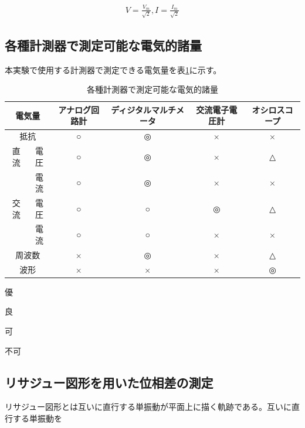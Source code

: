 \documentclass[dvipdfmx]{jsarticle}
\begin{document}
\begin{eqnarray}
V = \frac{V_m}{\sqrt{2}}, I = \frac{I_m}{\sqrt2}
\end{eqnarray}

\subsection{各種計測器で測定可能な電気的諸量}

本実験で使用する計測器で測定できる電気量を表\ref{tb:table_dennki}に示す。

\begin{table}[h]
  \caption{各種計測器で測定可能な電気的諸量}
  \label{tb:table_dennki}
  \begin{threeparttable}
    \begin{tabular}{|c|c|c|c|c|c|}\hline 
      \multicolumn{2}{|c|}{電気量} & アナログ回路計 & ディジタルマルチメータ & 交流電子電圧計 & オシロスコープ \\ \hline
      \multicolumn{2}{|c|}{抵抗} & ○\footnotemark[2] & ◎\footnotemark[1] & ×\footnotemark[4] & × \\ \cline{1-6}
      直流 & 電圧 & ○ & ◎ & × & △\footnotemark[3]\\ \cline{2-6}
       & 電流 & ○ & ◎ & × & ×\\ \hline
      交流 & 電圧 & ○ & ○ & ◎ & △\\ \cline{2-6}
       & 電流 & ○ & ○ & × & ×\\ \hline
      \multicolumn{2}{|c|}{周波数} & × & ◎ & × & △\\ \hline
      \multicolumn{2}{|c|}{波形} & ×  & ×  & ×  & ◎ \\ \hline 
    \end{tabular}
    \begin{tablenotes}\footnotesize
      \item[1] 優
      \item[2] 良
      \item[3] 可
      \item[4] 不可
      \end{tablenotes}
\end{threeparttable}
\end{table}
\subsection{リサジュー図形を用いた位相差の測定}

リサジュー図形とは互いに直行する単振動が平面上に描く軌跡である。互いに直行する単振動を
\end{document}
